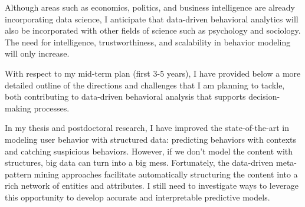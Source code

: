 \documentclass[10.5pt]{article}
\begin{document}
Although areas such as economics, politics, and business intelligence are already incorporating data science, I anticipate that data-driven behavioral analytics will also be incorporated with other fields of science such as psychology and sociology. The need for intelligence, trustworthiness, and scalability in behavior modeling will only increase.

\vskip 0.03in
\vskip 0.01in

With respect to my mid-term plan (first 3-5 years), I have provided below a more detailed outline of the directions and challenges that I am planning to tackle, both contributing to data-driven behavioral analysis that supports decision-making processes.

\vskip 0.02in

In my thesis and postdoctoral research, I have improved the state-of-the-art in modeling user behavior with structured data: predicting behaviors with contexts and catching suspicious behaviors. However, if we don't model the content with structures, big data can turn into a big mess. Fortunately, the data-driven meta-pattern mining approaches facilitate automatically structuring the content into a rich network of entities and attributes. I still need to investigate ways to leverage this opportunity to develop accurate and interpretable predictive models.
\end{document}
